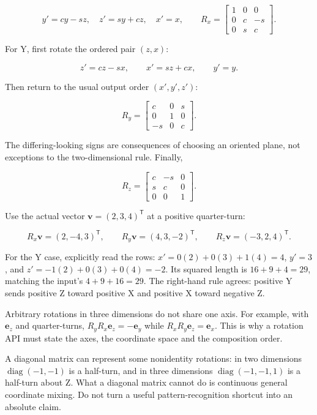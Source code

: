 \[
y'=cy-sz,\quad z'=sy+cz,\quad x'=x,
\qquad
R_x=\begin{bmatrix}1&0&0\\0&c&-s\\0&s&c\end{bmatrix}.
\]

For Y, first rotate the ordered pair \((z,x)\):

\[
z'=cz-sx,\qquad x'=sz+cx,\qquad y'=y.
\]

Then return to the usual output order \((x',y',z')\):

\[
R_y=\begin{bmatrix}c&0&s\\0&1&0\\-s&0&c\end{bmatrix}.
\]

The differing-looking signs are consequences of choosing an oriented plane, not exceptions to the two-dimensional rule. Finally,

\[
R_z=\begin{bmatrix}c&-s&0\\s&c&0\\0&0&1\end{bmatrix}.
\]

Use the actual vector \(\mathbf v=(2,3,4)^{\mathsf T}\) at a positive quarter-turn:

\[
R_x\mathbf v=(2,-4,3)^{\mathsf T},\qquad
R_y\mathbf v=(4,3,-2)^{\mathsf T},\qquad
R_z\mathbf v=(-3,2,4)^{\mathsf T}.
\]

For the Y case, explicitly read the rows: \(x'=0(2)+0(3)+1(4)=4\), \(y'=3\), and \(z'=-1(2)+0(3)+0(4)=-2\). Its squared length is \(16+9+4=29\), matching the input's \(4+9+16=29\). The right-hand rule agrees: positive Y sends positive Z toward positive X and positive X toward negative Z.

Arbitrary rotations in three dimensions do not share one axis. For example, with \(\mathbf e_z\) and quarter-turns, \(R_yR_x\mathbf e_z=-\mathbf e_y\) while \(R_xR_y\mathbf e_z=\mathbf e_x\). This is why a rotation API must state the axes, the coordinate space and the composition order.

A diagonal matrix can represent some nonidentity rotations: in two dimensions \(\operatorname{diag}(-1,-1)\) is a half-turn, and in three dimensions \(\operatorname{diag}(-1,-1,1)\) is a half-turn about Z. What a diagonal matrix cannot do is continuous general coordinate mixing. Do not turn a useful pattern-recognition shortcut into an absolute claim.

